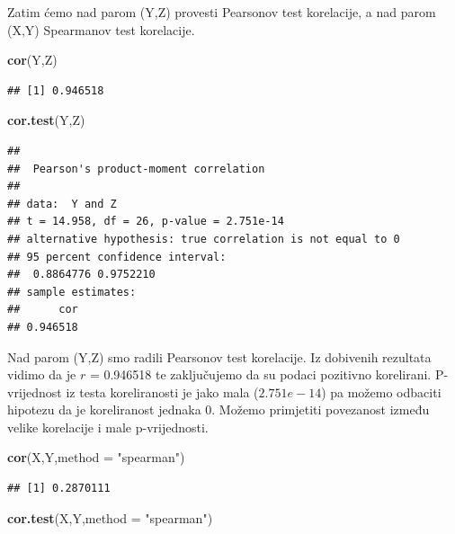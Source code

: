 \documentclass[]{article}
\newenvironment{Shaded}{\begin{snugshade}}{\end{snugshade}}
\newcommand{\KeywordTok}[1]{\textcolor[rgb]{0.13,0.29,0.53}{\textbf{{#1}}}}
\newcommand{\DataTypeTok}[1]{\textcolor[rgb]{0.13,0.29,0.53}{{#1}}}
\newcommand{\StringTok}[1]{\textcolor[rgb]{0.31,0.60,0.02}{{#1}}}
\newcommand{\NormalTok}[1]{{#1}}
\begin{document}
Zatim ćemo nad parom (Y,Z) provesti Pearsonov test korelacije, a nad
parom (X,Y) Spearmanov test korelacije.

\begin{Shaded}
\begin{Highlighting}[]
\KeywordTok{cor}\NormalTok{(Y,Z)}
\end{Highlighting}
\end{Shaded}

\begin{verbatim}
## [1] 0.946518
\end{verbatim}

\begin{Shaded}
\begin{Highlighting}[]
\KeywordTok{cor.test}\NormalTok{(Y,Z)}
\end{Highlighting}
\end{Shaded}

\begin{verbatim}
## 
##  Pearson's product-moment correlation
## 
## data:  Y and Z
## t = 14.958, df = 26, p-value = 2.751e-14
## alternative hypothesis: true correlation is not equal to 0
## 95 percent confidence interval:
##  0.8864776 0.9752210
## sample estimates:
##      cor 
## 0.946518
\end{verbatim}

Nad parom (Y,Z) smo radili Pearsonov test korelacije. Iz dobivenih
rezultata vidimo da je \(r\) = 0.946518 te zaključujemo da su podaci
pozitivno korelirani. P-vrijednost iz testa koreliranosti je jako mala
(\(2.751e-14\)) pa možemo odbaciti hipotezu da je koreliranost jednaka
0. Možemo primjetiti povezanost između velike korelacije i male
p-vrijednosti.

\begin{Shaded}
\begin{Highlighting}[]
\KeywordTok{cor}\NormalTok{(X,Y,}\DataTypeTok{method =} \StringTok{"spearman"}\NormalTok{)}
\end{Highlighting}
\end{Shaded}

\begin{verbatim}
## [1] 0.2870111
\end{verbatim}

\begin{Shaded}
\begin{Highlighting}[]
\KeywordTok{cor.test}\NormalTok{(X,Y,}\DataTypeTok{method =} \StringTok{"spearman"}\NormalTok{)}
\end{Highlighting}
\end{Shaded}
\end{document}
